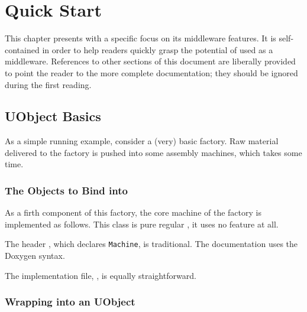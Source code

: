 
\chapter{Quick Start}
\label{sec:uob:quick}

This chapter presents \usdk with a specific focus on its middleware
features.  It is self-contained in order to help readers quickly grasp the
potential of \urbi used as a middleware.  References to other sections of
this document are liberally provided to point the reader to the more
complete documentation; they should be ignored during the first reading.

\newcommand{\machineDir}{\uobjectsDir/test/machine.uob}
\newcommand{\machineFile}[1]
{}

\section{UObject Basics}

As a simple running example, consider a (very) basic factory.  Raw material
delivered to the factory is pushed into some assembly machines, which takes
some time.

\subsection{The Objects to Bind into \urbi}

As a firth component of this factory, the core machine of the factory is
implemented as follows.  This class is pure regular \Cxx, it uses no \urbi
feature at all.

The header , which declares \lstinline|Machine|, is
traditional.  The documentation uses the Doxygen syntax.

\machineFile{machine.hh}

The implementation file, , is equally straightforward.

\machineFile{machine.cc}

\subsection{Wrapping into an UObject}

